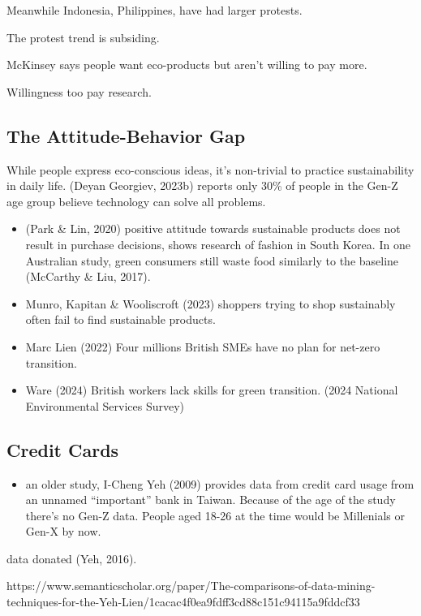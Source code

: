 \documentclass[
  letterpaper,
  DIV=11,
  numbers=noendperiod]{scrartcl}
\providecommand{\tightlist}{%
  \setlength{\itemsep}{0pt}\setlength{\parskip}{0pt}}\usepackage{longtable,booktabs,array}
\begin{document}
Meanwhile Indonesia, Philippines, have had larger protests.

The protest trend is subsiding.

McKinsey says people want eco-products but aren't willing to pay more.

Willingness too pay research.

\subsection{The Attitude-Behavior Gap}\label{the-attitude-behavior-gap}

While people express eco-conscious ideas, it's non-trivial to practice
sustainability in daily life. (Deyan Georgiev, 2023b) reports only 30\%
of people in the Gen-Z age group believe technology can solve all
problems.

\begin{itemize}
\tightlist
\item
  (Park \& Lin, 2020) positive attitude towards sustainable products
  does not result in purchase decisions, shows research of fashion in
  South Korea. In one Australian study, green consumers still waste food
  similarly to the baseline (McCarthy \& Liu, 2017).
\item
  Munro, Kapitan \& Wooliscroft (2023) shoppers trying to shop
  sustainably often fail to find sustainable products.
\item
  Marc Lien (2022) Four millions British SMEs have no plan for net-zero
  transition.
\item
  Ware (2024) British workers lack skills for green transition. (2024
  National Environmental Services Survey)
\end{itemize}

\subsection{Credit Cards}\label{credit-cards}

\begin{itemize}
\tightlist
\item
  an older study, I-Cheng Yeh (2009) provides data from credit card
  usage from an unnamed ``important'' bank in Taiwan. Because of the age
  of the study there's no Gen-Z data. People aged 18-26 at the time
  would be Millenials or Gen-X by now.
\end{itemize}

data donated (Yeh, 2016).

https://www.semanticscholar.org/paper/The-comparisons-of-data-mining-techniques-for-the-Yeh-Lien/1cacac4f0ea9fdff3cd88c151c94115a9fddcf33
\end{document}
